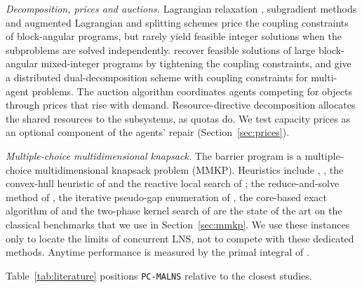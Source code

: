 \documentclass[a4paper,fleqn]{cas-sc}
\newcommand{\pcm}{\texttt{PC-MALNS}}
\begin{document}
\textit{Decomposition, prices and auctions.} Lagrangian relaxation \citep{held1974, fisher1981, guignard2003}, subgradient methods \citep{polyak1969} and augmented Lagrangian and splitting schemes \citep{bertsekas1982, boyd2011} price the coupling constraints of block-angular programs, but rarely yield feasible integer solutions when the subproblems are solved independently. \citet{vujanic2016} recover feasible solutions of large block-angular mixed-integer programs by tightening the coupling constraints, and \citet{falsone2017} give a distributed dual-decomposition scheme with coupling constraints for multi-agent problems. The auction algorithm \citep{bertsekas1988} coordinates agents competing for objects through prices that rise with demand. Resource-directive decomposition \citep{geoffrion1970} allocates the shared resources to the subsystems, as quotas do. We test capacity prices as an optional component of the agents' repair (Section~\ref{sec:prices}).

\textit{Multiple-choice multidimensional knapsack.} The barrier program is a multiple-choice multidimensional knapsack problem (MMKP). Heuristics include \citet{khan2002}, \citet{hifi2004}, the convex-hull heuristic of \citet{akbar2006} and the reactive local search of \citet{hifi2006}; the reduce-and-solve method of \citet{chen2014}, the iterative pseudo-gap enumeration of \citet{gao2017}, the core-based exact algorithm of \citet{mansini2020} and the two-phase kernel search of \citet{lamanna2022} are the state of the art on the classical benchmarks that we use in Section~\ref{sec:mmkp}. We use these instances only to locate the limits of concurrent LNS, not to compete with these dedicated methods. Anytime performance is measured by the primal integral of \citet{berthold2013}.

Table~\ref{tab:literature} positions \pcm{} relative to the closest studies.
\end{document}
